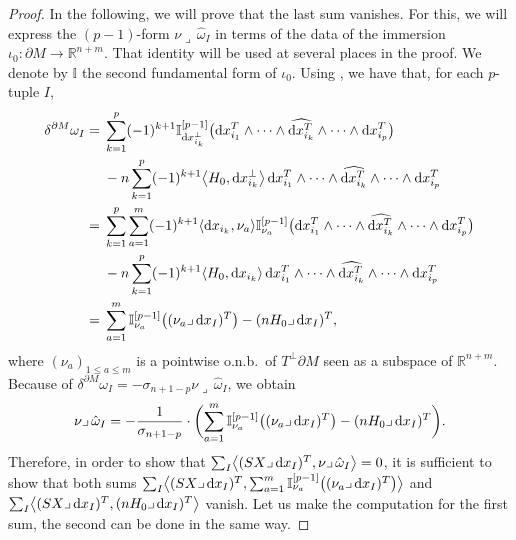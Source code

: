 \documentclass[pdftex]{sigma}
\numberwithin{equation}{section}
\begin{document}
\begin{proof}
In the following, we will prove that the last sum vanishes.
For this, we will express the $(p-1)$-form $\nu\lrcorner\,\hat{\omega}_I$  in terms of the data of the immersion $\iota_0\colon\partial M\to\mathbb{R}^{n+m}$. That identity will be used at several places in the proof. We denote by $\mathbb{I}$ the second fundamental form of $\iota_0$. Using \cite[equation~(3.3)]{Savo05}, we have that, for each $p$-tuple $I$,
\begin{align}
\delta^{\partial M}\omega_I={} &\sum_{k=1}^p(-1)^{k+1}\mathbb{I}_{{\rm d}x_{i_k}^\perp}^{[p-1]}\bigl({\rm d}x_{i_1}^T\wedge \dots \wedge\widehat{{\rm d}x_{i_k}^T}\wedge\dots \wedge {\rm d}x_{i_p}^T\bigr)\nonumber\\
&{}-n \sum_{k=1}^p(-1)^{k+1}\bigl\langle H_0, {\rm d}x_{i_k}^\perp\bigr\rangle\,{\rm d}x_{i_1}^T\wedge\dots\wedge\widehat{{\rm d}x_{i_k}^T}\wedge\dots \wedge {\rm d}x_{i_p}^T\nonumber\\
 ={} &\sum_{k=1}^p\sum_{a=1}^m(-1)^{k+1}\langle {\rm d}x_{i_k},\nu_a\rangle\mathbb{I}_{\nu_a}^{[p-1]}\bigl({\rm d}x_{i_1}^T\wedge \dots \wedge\widehat{{\rm d}x_{i_k}^T}\wedge\dots \wedge {\rm d}x_{i_p}^T\bigr)\nonumber\\
 &{}-n \sum_{k=1}^p(-1)^{k+1}\langle H_0, {\rm d}x_{i_k}\rangle\,{\rm d}x_{i_1}^T\wedge\dots\wedge\widehat{{\rm d}x_{i_k}^T}\wedge\dots \wedge {\rm d}x_{i_p}^T\nonumber\\
 ={}&\sum_{a=1}^m\mathbb{I}_{\nu_a}^{[p-1]}\bigl((\nu_a\lrcorner\,{\rm d}x_I)^T\bigr)-(nH_0\lrcorner\,{\rm d}x_I)^T,\label{eq:deltaomegaISavo}
\end{align}
where $(\nu_a)_{1\leq a\leq m}$ is a pointwise o.n.b.\ of $T^\perp \partial M$ seen as a subspace of $\mathbb{R}^{n+m}$. Because of $\delta^{\partial M}\omega_I=-\sigma_{n+1-p}\nu\lrcorner\,\hat{\omega}_I$, we obtain
\begin{equation}\label{eq:nuinterioromega}
\nu\lrcorner\,\hat{\omega}_I=-\frac{1}{\sigma_{n+1-p}}\cdot\biggl(\sum_{a=1}^m\mathbb{I}_{\nu_a}^{[p-1]}\bigl((\nu_a\lrcorner\,{\rm d}x_I)^T\bigr)-(nH_0\lrcorner\,{\rm d}x_I)^T\biggr).
\end{equation}
Therefore, in order to show that $\sum_I\bigl\langle (SX\lrcorner\,{\rm d}x_I)^T,\nu\lrcorner\,\hat{\omega}_I\bigr\rangle=0$, it is sufficient to show that both sums $\sum_I\bigl\langle (SX\lrcorner\,{\rm d}x_I)^T,\sum_{a=1}^m\mathbb{I}_{\nu_a}^{[p-1]}\bigl((\nu_a\lrcorner\,{\rm d}x_I)^T\bigr)\bigr\rangle$ and $\sum_I\bigl\langle (SX\lrcorner\,{\rm d}x_I)^T,(nH_0\lrcorner\,{\rm d}x_I)^T\bigr\rangle$ vanish.
Let us make the computation for the first sum, the second can be done in the same way.

\end{proof}
\end{document}

